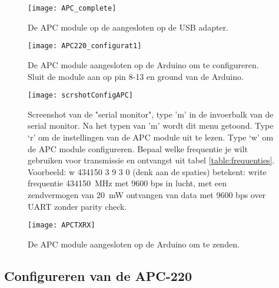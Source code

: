  
\begin{figure}
    \centering
    \texttt{[image: APC\_complete]}
    \caption{De APC module op de aangesloten op de USB adapter.}
   \label{fig:APC_complete}
\end{figure}

\begin{figure}
    \centering
    \texttt{[image: APC220\_configurat1]}
    \caption{De APC module aangesloten op de Arduino om te configureren.
    Sluit de module aan op pin 8-13 en ground van de Arduino.}
   \label{fig:APC220_configurat1}
\end{figure}

\begin{figure}
    \centering
    \texttt{[image: scrshotConfigAPC]}
    
    \caption{Screenshot van de "serial monitor", type 'm' in de invoerbalk
    van de serial monitor. Na het typen van 'm' wordt dit menu getoond.
    Type `r' om de instellingen van de APC module uit te lezen. Type `w'
    om de APC module configureren. Bepaal welke frequentie je wilt
    gebruiken voor transmissie en ontvangst uit tabel \ref{table:frequenties}.
    Voorbeeld: w 434150 3 9 3 0 (denk aan de spaties) betekent: write
    frequentie \SI{434150}{\MHz} met 9600 bps in lucht, met een zendvermogen van
    \SI{20}{\milli\watt} ontvangen van data met 9600 bps over UART zonder parity
    check.}
   
   \label{fig:scrshotConfigAPC}
\end{figure}

\begin{figure}
    \centering
    \texttt{[image: APCTXRX]}
    \caption{De APC module aangesloten op de Arduino om te zenden.}
   \label{fig:APCTXRX}
\end{figure}

\subsection{Configureren van de APC-220}


